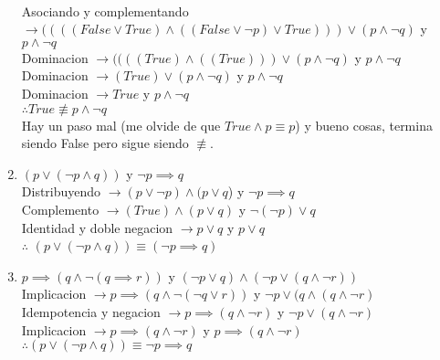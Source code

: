 \documentclass[10pt,a4paper,2in]{article}
\begin{document}
\begin{enumerate}[label=\alph*]
\\Asociando y complementando $\rightarrow ((((False\lor True) \land ((False\lor \lnot p) \lor True)))\lor (p \land \lnot q)$ y $p\land \lnot q$
\\Dominacion $\rightarrow ((((True) \land ((True)))\lor (p \land \lnot q)$ y $p\land \lnot q$
\\Dominacion $\rightarrow (True) \lor (p \land \lnot q)$ y $p\land \lnot q$
\\Dominacion $\rightarrow True$ y $p\land \lnot q$
\\$\therefore True \not\equiv p\land \lnot q$
\\Hay un paso mal (me olvide de que $True \land p \equiv p$) y bueno cosas, termina siendo False pero sigue siendo $\not\equiv$.
\item $(p \lor (\lnot p \land q))$ y $\lnot p \implies q$
\\Distribuyendo $\rightarrow (p\lor \lnot p)\land(p\lor q$) y $\lnot p \implies q$
\\Complemento  $\rightarrow (True)\land(p\lor q)$ y $\lnot (\lnot p) \lor q$
\\Identidad y doble negacion $\rightarrow p\lor q$ y $p \lor q$
\\$\therefore$ $(p \lor (\lnot p \land q))\equiv (\lnot p \implies q)$
\item $p\implies(q\land \lnot(q\implies r))$ y $(\lnot p \lor q)\land(\lnot p\lor (q\land \lnot r))$
\\ Implicacion $\rightarrow p \implies (q\land \lnot(\lnot q \lor r))$ y $\lnot p \lor (q\land (q\land \lnot r)$
\\ Idempotencia y negacion $\rightarrow p \implies (q\land \lnot r)$ y $\lnot p \lor (q \land \lnot r)$
\\ Implicacion $\rightarrow p \implies (q\land \lnot r)$ y $p \implies (q \land \lnot r)$
\\ $\therefore (p \lor (\lnot p \land q)) \equiv \lnot p \implies q$
\end{enumerate}
\end{document}

